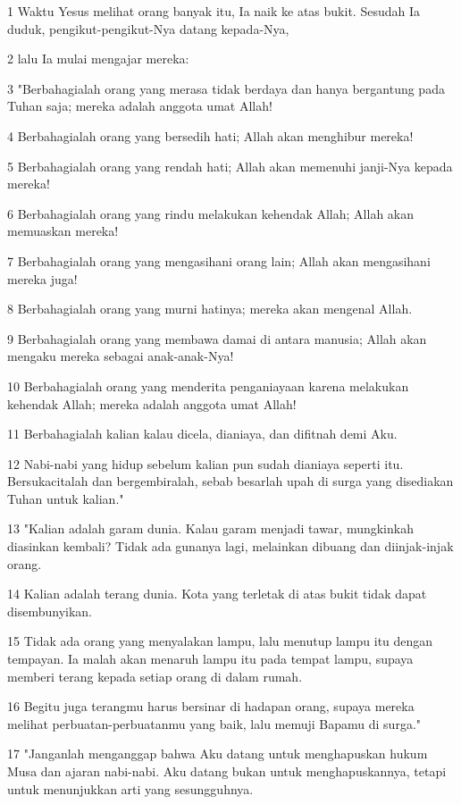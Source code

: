 \par 1 Waktu Yesus melihat orang banyak itu, Ia naik ke atas bukit. Sesudah Ia duduk, pengikut-pengikut-Nya datang kepada-Nya,
\par 2 lalu Ia mulai mengajar mereka:
\par 3 "Berbahagialah orang yang merasa tidak berdaya dan hanya bergantung pada Tuhan saja; mereka adalah anggota umat Allah!
\par 4 Berbahagialah orang yang bersedih hati; Allah akan menghibur mereka!
\par 5 Berbahagialah orang yang rendah hati; Allah akan memenuhi janji-Nya kepada mereka!
\par 6 Berbahagialah orang yang rindu melakukan kehendak Allah; Allah akan memuaskan mereka!
\par 7 Berbahagialah orang yang mengasihani orang lain; Allah akan mengasihani mereka juga!
\par 8 Berbahagialah orang yang murni hatinya; mereka akan mengenal Allah.
\par 9 Berbahagialah orang yang membawa damai di antara manusia; Allah akan mengaku mereka sebagai anak-anak-Nya!
\par 10 Berbahagialah orang yang menderita penganiayaan karena melakukan kehendak Allah; mereka adalah anggota umat Allah!
\par 11 Berbahagialah kalian kalau dicela, dianiaya, dan difitnah demi Aku.
\par 12 Nabi-nabi yang hidup sebelum kalian pun sudah dianiaya seperti itu. Bersukacitalah dan bergembiralah, sebab besarlah upah di surga yang disediakan Tuhan untuk kalian."
\par 13 "Kalian adalah garam dunia. Kalau garam menjadi tawar, mungkinkah diasinkan kembali? Tidak ada gunanya lagi, melainkan dibuang dan diinjak-injak orang.
\par 14 Kalian adalah terang dunia. Kota yang terletak di atas bukit tidak dapat disembunyikan.
\par 15 Tidak ada orang yang menyalakan lampu, lalu menutup lampu itu dengan tempayan. Ia malah akan menaruh lampu itu pada tempat lampu, supaya memberi terang kepada setiap orang di dalam rumah.
\par 16 Begitu juga terangmu harus bersinar di hadapan orang, supaya mereka melihat perbuatan-perbuatanmu yang baik, lalu memuji Bapamu di surga."
\par 17 "Janganlah menganggap bahwa Aku datang untuk menghapuskan hukum Musa dan ajaran nabi-nabi. Aku datang bukan untuk menghapuskannya, tetapi untuk menunjukkan arti yang sesungguhnya.
